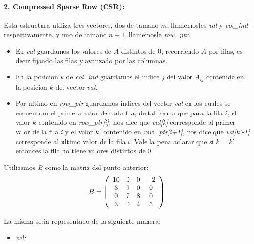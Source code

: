 \paragraph{2. Compressed Sparse Row (CSR):}

Esta estructura utiliza tres vectores, dos de tamano $m$, llamemosles \textit{val} y \textit{col_ind} respectivamente, y uno de tamano $n+1$, llamemosle \textit{row_ptr}.
\begin{itemize}
    \item En \textit{val} guardamos los valores de $A$ distintos de 0, recorriendo $A$ por filas, es decir fijando las filas y avanzado por las columnas.
    \item En la posicion $k$ de \textit{col_ind} guardamos el indice $j$ del valor $A_{ij}$ contenido en la posicion $k$ del vector \textit{val}.
    \item Por ultimo en \textit{row_ptr} guardamos indices del vector \textit{val} en los cuales se encuentran el primera valor de cada fila, de tal
     forma que para la fila $i$, el valor $k$ contenido en \textit{row_ptr[i]}, nos dice que \textit{val[k]} corresponde al primer valor de la fila
      $i$ y el valor $k'$ contenido en \textit{row_ptr[i+1]}, nos dice que \textit{val[k'-1]} corresponde al ultimo valor de la fila $i$.
      Vale la pena aclarar que si $k = k'$ entonces la fila no tiene valores distintos de 0.
\end{itemize}

Utilizemos $B$ como la matriz del punto anterior:
\[
  B = \left(\begin{array}{*5{c}}
    10 & 0 & 0 & -2\\
    3  & 9 & 0 & 0 \\
    0  & 7 & 8 & 0 \\
    3  & 0 & 4 & 5
  \end{array}\right)
\]

La misma seria representado de la siguiente manera:
\begin{itemize}
  \item \textit{val:}
\end{itemize}
\begin{center}
\end{center}

